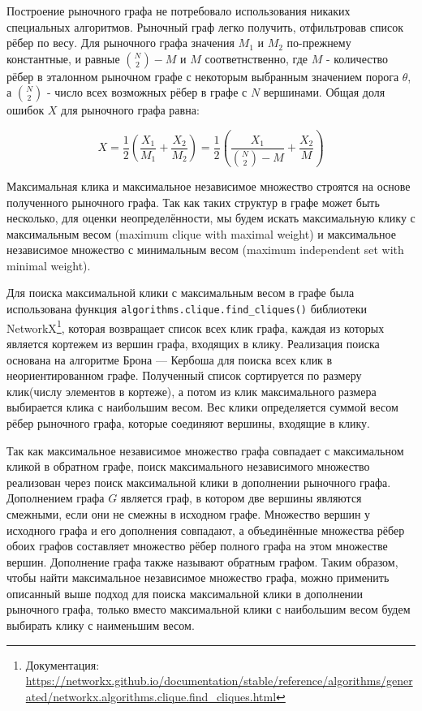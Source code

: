 Построение рыночного графа не потребовало использования никаких специальных алгоритмов. Рыночный граф легко получить, отфильтровав список рёбер по весу. Для рыночного графа значения $M_1$ и $M_2$ по-прежнему константные, и равные $\binom{N}{2} - M$ и $M$ соответнственно, где $M$ - количество рёбер в эталонном рыночном графе с некоторым выбранным значением порога $\theta$, а $\binom{N}{2}$ - число всех возможных рёбер в графе с $N$ вершинами. Общая доля ошибок $X$ для рыночного графа равна:

\begin{equation}
X = \frac{1}{2}\left(\frac{X_1}{M_1} + \frac{X_2}{M_2}\right) = \frac{1}{2}\left(\frac{X_1}{\binom{N}{2} - M} + \frac{X_2}{M}\right)
\end{equation}


Максимальная клика и максимальное независимое множество строятся на основе полученного рыночного графа. Так как таких структур в графе может быть несколько, для оценки неопределённости, мы будем искать максимальную клику с максимальным весом (maximum clique with maximal weight) и максимальное независимое множество с минимальным весом (maximum independent set with minimal weight).  


Для поиска максимальной клики с максимальным весом в графе была использована функция \verb|algorithms.clique.find_cliques()| библиотеки NetworkX\footnote{Документация:  \url{https://networkx.github.io/documentation/stable/reference/algorithms/generated/networkx.algorithms.clique.find_cliques.html}}, которая возвращает список всех клик графа, каждая из которых является кортежем из вершин графа, входящих в клику. Реализация поиска основана на алгоритме Брона — Кербоша\cite{maximum-clique} для поиска всех клик в неориентированном графе. Полученный список сортируется по размеру клик(числу элементов в кортеже), а потом из клик максимального размера выбирается клика с наибольшим весом. Вес клики определяется суммой весом рёбер рыночного графа, которые соединяют вершины, входящие в клику.


Так как максимальное независимое множество графа совпадает с максимальном кликой в обратном графе, поиск максимального независимого множество реализован через поиск максимальной клики в дополнении рыночного графа. Дополнением графа $G$ является граф, в котором две вершины являются смежными, если они не смежны в исходном графе. Множество вершин у исходного графа и его дополнения совпадают, а объединённые множества рёбер обоих графов составляет множество рёбер полного графа на этом множестве вершин. Дополнение графа также называют обратным графом. Таким образом, чтобы найти максимальное независимое множество графа, можно применить описанный выше подход для поиска максимальной клики в дополнении рыночного графа, только вместо максимальной клики с наибольшим весом будем выбирать клику с наименьшим весом.


